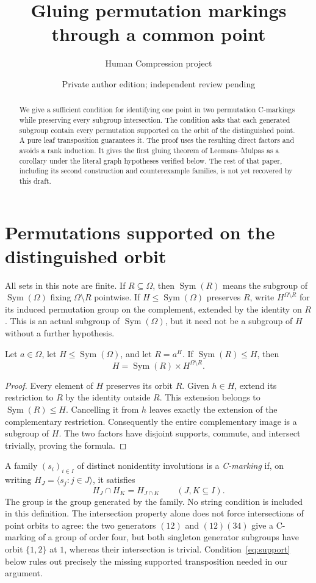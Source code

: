 \documentclass[a4paper,11pt]{article}
\title{Gluing permutation markings through a common point}
\author{Human Compression project}\date{Private author edition; independent review pending}
\newcommand{\Sym}{\operatorname{Sym}}
\newcommand{\gen}[1]{\langle #1\rangle}
\begin{document}
\maketitle
\begin{abstract}
We give a sufficient condition for identifying one point in two permutation
C-markings while preserving every subgroup intersection. The condition asks
that each generated subgroup contain every permutation supported on the orbit
of the distinguished point. A pure leaf transposition guarantees it.
The proof uses the resulting direct factors and avoids a rank induction.
It gives the first gluing theorem of Leemans--Mulpas as a corollary
under the literal graph hypotheses verified below. The rest of that paper,
including its second construction and counterexample families, is not yet
recovered by this draft.
\end{abstract}

\section{Permutations supported on the distinguished orbit}
All sets in this note are finite. If $R\subseteq\Omega$, then $\Sym(R)$
means the subgroup of $\Sym(\Omega)$ fixing $\Omega\setminus R$ pointwise.
If $H\leq\Sym(\Omega)$ preserves $R$, write $H^{\Omega\setminus R}$ for
its induced permutation group on the complement, extended by the identity on
$R$. This is an actual subgroup of $\Sym(\Omega)$, but it need not be a
subgroup of $H$ without a further hypothesis.

\begin{lemma}\label{lem:factor}
Let $a\in\Omega$, let $H\leq\Sym(\Omega)$, and let $R=a^H$.
If $\Sym(R)\leq H$, then
\[
 H=\Sym(R)\times H^{\Omega\setminus R}.
\]
\end{lemma}
\begin{proof}
Every element of $H$ preserves its orbit $R$. Given $h\in H$, extend its
restriction to $R$ by the identity outside $R$. This extension belongs to
$\Sym(R)\leq H$. Cancelling it from $h$ leaves exactly the extension of
the complementary restriction. Consequently the entire complementary image
is a subgroup of $H$. The two factors have disjoint supports, commute, and
intersect trivially, proving the formula.
\end{proof}

A family $(s_i)_{i\in I}$ of distinct nonidentity involutions is a
\emph{C-marking} if, on writing $H_J=\gen{s_j:j\in J}$, it satisfies
\[
 H_J\cap H_K=H_{J\cap K}\qquad(J,K\subseteq I).
\]
The group is the group generated by the family. No string condition is
included in this definition. The intersection property alone does not force
intersections of point orbits to agree: the two generators $(12)$ and
$(12)(34)$ give a C-marking of a group of order four, but both singleton
generator subgroups have orbit $\{1,2\}$ at $1$, whereas their intersection
is trivial. Condition~\eqref{eq:support} below rules out precisely the
missing supported transposition needed in our argument.
\end{document}
